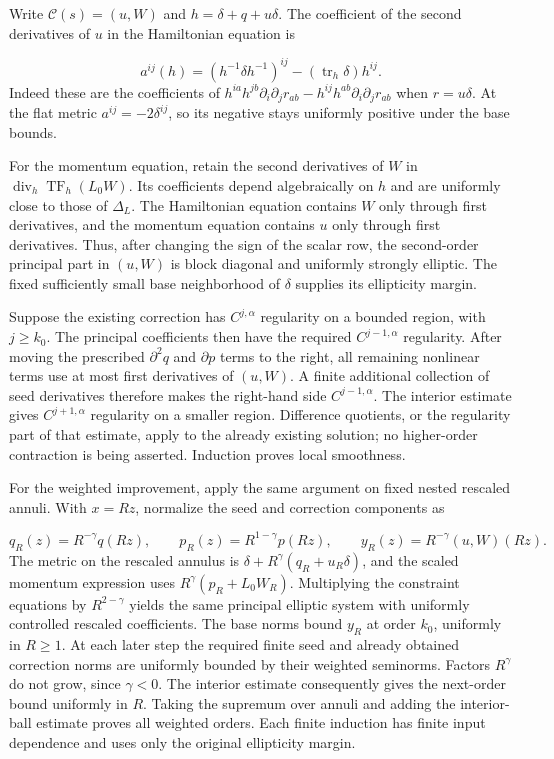 \documentclass[
  english,
  11pt,
  reqno]{amsart}
\begin{document}
Write \(\mathcal C(s)=(u,W)\) and \(h=\delta+q+u\delta\). The
coefficient of the second derivatives of \(u\) in the Hamiltonian
equation is

\label{eq:online-chart-scalar-principal-coefficient} \[
a^{ij}(h)
=(h^{-1}\delta h^{-1})^{ij}
-(\operatorname{tr}_h\delta)h^{ij}.
\] Indeed these are the coefficients of
\(h^{ia}h^{jb}\partial_i\partial_j r_{ab}
-h^{ij}h^{ab}\partial_i\partial_jr_{ab}\) when \(r=u\delta\). At the
flat metric \(a^{ij}=-2\delta^{ij}\), so its negative stays uniformly
positive under the base bounds.

For the momentum equation, retain the second derivatives of \(W\) in
\(\operatorname{div}_h\operatorname{TF}_h(L_0W)\). Its coefficients
depend algebraically on \(h\) and are uniformly close to those of
\(\Delta_L\). The Hamiltonian equation contains \(W\) only through first
derivatives, and the momentum equation contains \(u\) only through first
derivatives. Thus, after changing the sign of the scalar row, the
second-order principal part in \((u,W)\) is block diagonal and uniformly
strongly elliptic. The fixed sufficiently small base neighborhood of
\(\delta\) supplies its ellipticity margin.

Suppose the existing correction has \(C^{j,\alpha}\) regularity on a
bounded region, with \(j\ge k_0\). The principal coefficients then have
the required \(C^{j-1,\alpha}\) regularity. After moving the prescribed
\(\partial^2q\) and \(\partial p\) terms to the right, all remaining
nonlinear terms use at most first derivatives of \((u,W)\). A finite
additional collection of seed derivatives therefore makes the right-hand
side \(C^{j-1,\alpha}\). The interior estimate gives \(C^{j+1,\alpha}\)
regularity on a smaller region. Difference quotients, or the regularity
part of that estimate, apply to the already existing solution; no
higher-order contraction is being asserted. Induction proves local
smoothness.

For the weighted improvement, apply the same argument on fixed nested
rescaled annuli. With \(x=Rz\), normalize the seed and correction
components as

\label{eq:online-chart-annular-normalized-fields} \[
q_R(z)=R^{-\gamma}q(Rz),\qquad
p_R(z)=R^{1-\gamma}p(Rz),\qquad
y_R(z)=R^{-\gamma}(u,W)(Rz).
\] The metric on the rescaled annulus is
\(\delta+R^\gamma(q_R+u_R\delta)\), and the scaled momentum expression
uses \(R^\gamma(p_R+L_0W_R)\). Multiplying the constraint equations by
\(R^{2-\gamma}\) yields the same principal elliptic system with
uniformly controlled rescaled coefficients. The base norms bound \(y_R\)
at order \(k_0\), uniformly in \(R\ge1\). At each later step the
required finite seed and already obtained correction norms are uniformly
bounded by their weighted seminorms. Factors \(R^\gamma\) do not grow,
since \(\gamma<0\). The interior estimate consequently gives the
next-order bound uniformly in \(R\). Taking the supremum over annuli and
adding the interior-ball estimate proves all weighted orders. Each
finite induction has finite input dependence and uses only the original
ellipticity margin.
\end{document}
